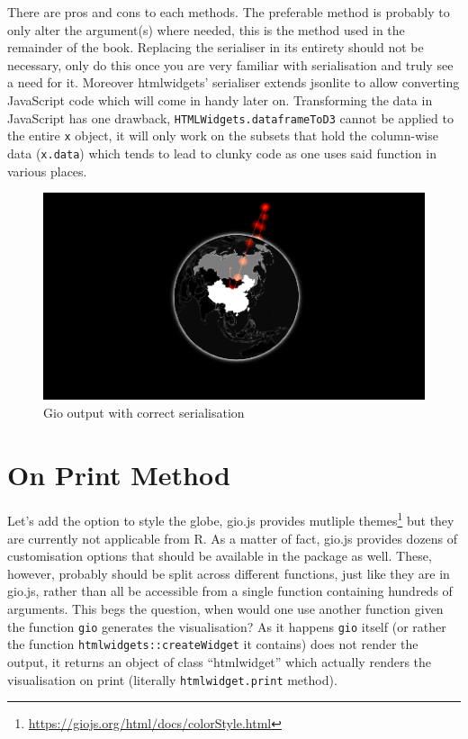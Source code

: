 \documentclass[
]{krantz}
\renewcommand{\href}[2]{#2\footnote{\url{#1}}}
\begin{document}
There are pros and cons to each methods. The preferable method is probably to only alter the argument(s) where needed, this is the method used in the remainder of the book. Replacing the serialiser in its entirety should not be necessary, only do this once you are very familiar with serialisation and truly see a need for it. Moreover htmlwidgets' serialiser extends jsonlite to allow converting JavaScript code which will come in handy later on. Transforming the data in JavaScript has one drawback, \texttt{HTMLWidgets.dataframeToD3} cannot be applied to the entire \texttt{x} object, it will only work on the subsets that hold the column-wise data (\texttt{x.data}) which tends to lead to clunky code as one uses said function in various places.

\begin{figure}
\centering
\includegraphics{images/gio-data.png}
\caption{Gio output with correct serialisation}
\end{figure}

\hypertarget{widgets-full-on-print}{%
\section{On Print Method}\label{widgets-full-on-print}}

Let's add the option to style the globe, gio.js provides mutliple \href{https://giojs.org/html/docs/colorStyle.html}{themes} but they are currently not applicable from R. As a matter of fact, gio.js provides dozens of customisation options that should be available in the package as well. These, however, probably should be split across different functions, just like they are in gio.js, rather than all be accessible from a single function containing hundreds of arguments. This begs the question, when would one use another function given the function \texttt{gio} generates the visualisation? As it happens \texttt{gio} itself (or rather the function \texttt{htmlwidgets::createWidget} it contains) does not render the output, it returns an object of class ``htmlwidget'' which actually renders the visualisation on print (literally \texttt{htmlwidget.print} method).
\end{document}
